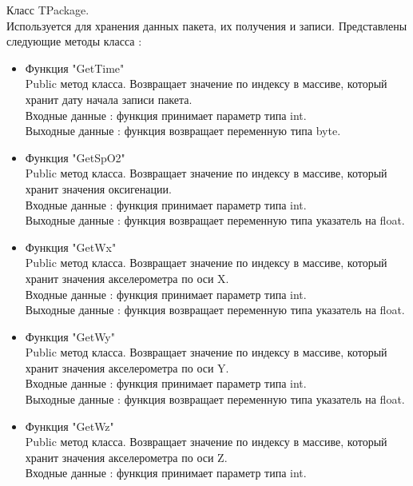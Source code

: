 \documentclass[a4document]{article}
\begin{document}
{\begin{itemize}
        \bigbreak
        Класс TPackage. \\
        Используется для хранения данных пакета, их получения и записи.
        Представлены следующие методы класса : 
            \begin{itemize}
                \item Функция "GetTime" \\
                    Public метод класса. Возвращает значение по индексу в массиве, который хранит дату начала записи пакета. \\ 
                    Входные данные : функция принимает параметр типа int. \\
                    Выходные данные : функция возвращает переменную типа byte.
                \item Функция "GetSpO2" \\
                    Public метод класса. Возвращает значение по индексу в массиве, который хранит значения оксигенации. \\ 
                    Входные данные : функция принимает параметр типа int. \\
                    Выходные данные : функция возвращает переменную типа указатель на float.
                \newpage
                \item Функция "GetWx" \\
                    Public метод класса. Возвращает значение по индексу в массиве, который хранит значения акселерометра по оси X. \\ 
                    Входные данные : функция принимает параметр типа int. \\
                    Выходные данные : функция возвращает переменную типа указатель на float.
                \item Функция "GetWy" \\
                    Public метод класса. Возвращает значение по индексу в массиве, который хранит значения акселерометра по оси Y. \\ 
                    Входные данные : функция принимает параметр типа int. \\
                    Выходные данные : функция возвращает переменную типа указатель на float.
                \item Функция "GetWz" \\
                    Public метод класса. Возвращает значение по индексу в массиве, который хранит значения акселерометра по оси Z. \\ 
                    Входные данные : функция принимает параметр типа int. \\

\end{itemize}
\end{itemize}}
\end{document}
